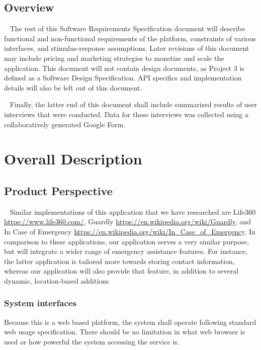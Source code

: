 \documentclass{scrreprt}
\begin{document}
\section{Overview}
\par ~ The rest of this Software Requirements Specification document will describe functional and non-functional requirements of the platform, constraints of various interfaces, and stimulus-response assumptions. Later revisions of this document may include pricing and marketing strategies to monetize and scale the application. This document will not contain design documents, as Project 3 is defined as a Software Design Specification. API specifics and implementation details will also be left out of this document. 

\par ~ Finally, the latter end of this document shall include summarized results of user interviews that were conducted. Data for these interviews was collected using a collaboratively generated Google Form.


\chapter{Overall Description}


\section{Product Perspective}
\par ~ Similar implementations of this application that we have researched are Life360 \url{https://www.life360.com/}, Guardly \url{https://en.wikipedia.org/wiki/Guardly}, and In Case of Emergency \url{https://en.wikipedia.org/wiki/In_Case_of_Emergency}. In comparison to these applications, our application serves a very similar purpose, but will integrate a wider range of emergency assistance features. For instance, the latter application is tailored more towards storing contact information, whereas our application will also provide that feature, in addition to several dynamic, location-based additions


\subsection{System interfaces}
Because this is a web based platform, the system shall operate following standard web usage specification. There should be no limitation in what web browser is used or how powerful the system accessing the service is.
\end{document}
